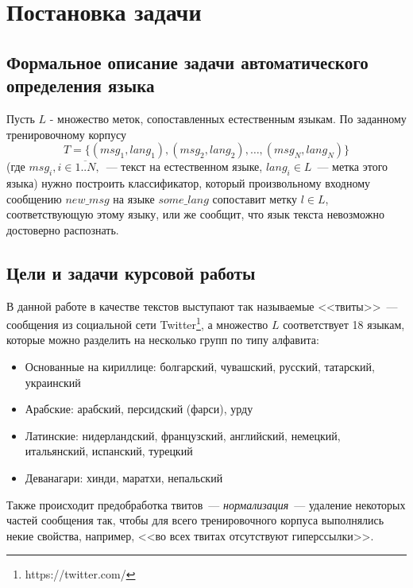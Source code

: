 \documentclass[a4paper, 14pt]{article}
\begin{document}
\pagebreak	        
	        
\section{Постановка задачи}
		\subsection{Формальное описание задачи автоматического определения языка}
		Пусть $L$ - множество меток, сопоставленных естественным языкам.
		По заданному тренировочному корпусу $$ T = \{(msg_{1}, lang_{1}), (msg_{2}, lang_{2}), \ldots, (msg_{N}, lang_{N}) \} $$
		(где $msg_{i}, i \in \overline{1..N},$~--- текст на естественном языке, $lang_{i} \in L$~--- метка этого языка) нужно построить классификатор,
		который произвольному входному сообщению $new\_msg$ на языке $some\_lang$ сопоставит метку $l \in L$, соответствующую этому языку,
		 или же сообщит, что язык текста невозможно достоверно распознать.
		\subsection{Цели и задачи курсовой работы}
		В данной работе в качестве текстов выступают так называемые <<твиты>>~--- сообщения из социальной сети Twitter\footnote{https://twitter.com/}, 
		а множество $L$ соответствует 18 языкам, которые можно разделить на несколько групп по типу алфавита:
		\begin{itemize}
			\item Основанные на кириллице: болгарский, чувашский, русский, татарский, украинский
			\item Арабские: арабский, персидский (фарси), урду
			\item Латинские: нидерландский, французский, английский, немецкий, итальянский, испанский, турецкий
			\item Деванагари: хинди, маратхи, непальский
		\end{itemize}
		Также происходит предобработка твитов~--- \textit{нормализация}~--- удаление некоторых частей сообщения так, чтобы для всего тренировочного корпуса выполнялись некие свойства, например, <<во всех твитах отсутствуют гиперссылки>>.
		
\end{document}
